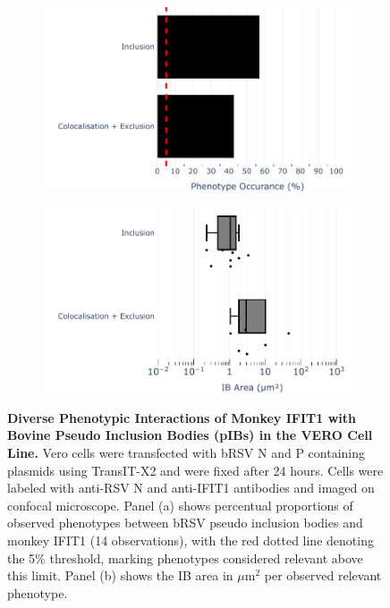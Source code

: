 \begin{figure}
    \begin{subfigure}{0.495\textwidth}
        \caption{}
        \includegraphics[width=1\linewidth]{09. Chapter 4/Figs/01. pIB/02. IFIT1/07. bar_i1_vero_bnbp.pdf}  
    \end{subfigure}
    \begin{subfigure}{0.495\textwidth}
        \caption{}
        \includegraphics[width=1\linewidth]{09. Chapter 4/Figs/01. pIB/02. IFIT1/08. box_i1_vero_bnbp.pdf}
    \end{subfigure}
    \caption[Diverse Phenotypic Interactions of Monkey IFIT1 with Bovine Pseudo Inclusion Bodies (pIBs) in the VERO Cell Line.]{\textbf{Diverse Phenotypic Interactions of Monkey IFIT1 with Bovine Pseudo Inclusion Bodies (pIBs) in the VERO Cell Line.} Vero cells were transfected with bRSV N and P containing plasmids using TransIT-X2 and were fixed after 24 hours. Cells were labeled with anti-RSV N and anti-IFIT1 antibodies and imaged on confocal microscope. Panel (a) shows percentual proportions of observed phenotypes between bRSV pseudo inclusion bodies and monkey IFIT1 (14 observations), with the red dotted line denoting the 5\% threshold, marking phenotypes considered relevant above this limit. Panel (b) shows the IB area in \(\mu \mbox{m}^2\) per observed relevant phenotype.}
    \label{fig:Diverse Phenotypic Interactions of Monkey IFIT1 with Bovine Pseudo Inclusion Bodies (pIBs) in the VERO Cell Line}
\end{figure}

